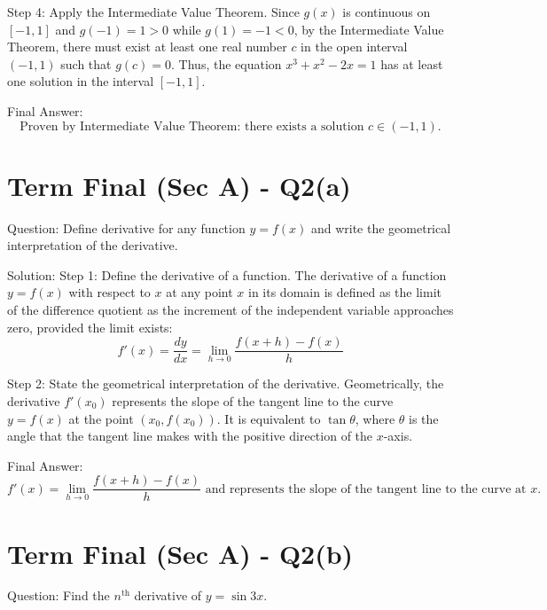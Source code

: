 \documentclass[11pt, a4paper]{article}
\begin{document}
Step 4: Apply the Intermediate Value Theorem. Since $g(x)$ is continuous on $[-1, 1]$ and $g(-1) = 1 > 0$ while $g(1) = -1 < 0$, by the Intermediate Value Theorem, there must exist at least one real number $c$ in the open interval $(-1, 1)$ such that $g(c) = 0$. Thus, the equation $x^3 + x^2 - 2x = 1$ has at least one solution in the interval $[-1, 1]$.

Final Answer:
$$
\boxed{\text{Proven by Intermediate Value Theorem: there exists a solution } c \in (-1, 1).}
$$


\section*{Term Final (Sec A) - Q2(a)}
Question:
Define derivative for any function $y = f(x)$ and write the geometrical interpretation of the derivative.

Solution:
Step 1: Define the derivative of a function.
The derivative of a function $y = f(x)$ with respect to $x$ at any point $x$ in its domain is defined as the limit of the difference quotient as the increment of the independent variable approaches zero, provided the limit exists:
$$f'(x) = \frac{dy}{dx} = \lim_{h \to 0} \frac{f(x+h) - f(x)}{h}$$

Step 2: State the geometrical interpretation of the derivative.
Geometrically, the derivative $f'(x_0)$ represents the slope of the tangent line to the curve $y = f(x)$ at the point $(x_0, f(x_0))$. It is equivalent to $\tan \theta$, where $\theta$ is the angle that the tangent line makes with the positive direction of the $x$-axis.

Final Answer:
$$
\boxed{f'(x) = \lim_{h \to 0} \frac{f(x+h) - f(x)}{h} \text{ and represents the slope of the tangent line to the curve at } x.}
$$


\section*{Term Final (Sec A) - Q2(b)}
Question:
Find the $n^{\text{th}}$ derivative of $y = \sin 3x$.
\end{document}
